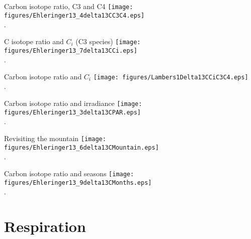 \documentclass[10pt]{beamer}
\begin{document}
\begin{frame}{Carbon isotope ratio, C3 and C4}
    \centering
    \texttt{[image: figures/Ehleringer13\_4delta13CC3C4.eps]}\\
    {\small \autocite[from][]{EhlOsm1991}.}
\end{frame}

\begin{frame}{C isotope ratio and $C_i$ (C3 species)}
    \centering
    \texttt{[image: figures/Ehleringer13\_7delta13CCi.eps]}\\
    {\small \autocite[from][]{EhlOsm1991}.}
\end{frame}

\begin{frame}{Carbon isotope ratio and $C_i$}
    \centering
    \texttt{[image: figures/Lambers1Delta13CCiC3C4.eps]}\\
    {\small \autocite[from][]{LambersEtAl1998}.}
\end{frame}

\begin{frame}{Carbon isotope ratio and irradiance}
    \centering
    \texttt{[image: figures/Ehleringer13\_3delta13CPAR.eps]}\\
    {\small \autocite[from][]{EhlOsm1991}.}
\end{frame}

\begin{frame}{Revisiting the mountain}
    \centering
    \texttt{[image: figures/Ehleringer13\_6delta13CMountain.eps]}\\
    {\small \autocite[from][]{EhlOsm1991}.}
\end{frame}

\begin{frame}{Carbon isotope ratio and seasons}
    \centering
    \texttt{[image: figures/Ehleringer13\_9delta13CMonths.eps]}\\
    {\small \autocite[from][]{EhlOsm1991}.}
\end{frame}

\section{Respiration}
\end{document}
